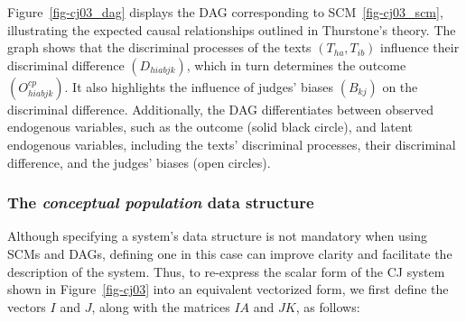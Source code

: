 \documentclass[
  authoryear,
  review,
  1p]{elsarticle}
\begin{document}
Figure~\ref{fig-cj03_dag} displays the DAG corresponding to
SCM~\ref{fig-cj03_scm}, illustrating the expected causal relationships
outlined in Thurstone's theory. The graph shows that the discriminal
processes of the texts \((T_{ha}, T_{ib})\) influence their discriminal
difference \((D_{hiabjk})\), which in turn determines the outcome
\((O^{cp}_{hiabjk})\). It also highlights the influence of judges'
biases \((B_{kj})\) on the discriminal difference. Additionally, the DAG
differentiates between observed endogenous variables, such as the
outcome (solid black circle), and latent endogenous variables, including
the texts' discriminal processes, their discriminal difference, and the
judges' biases (open circles).

\subsubsection{\texorpdfstring{The \emph{conceptual population} data
structure}{The conceptual population data structure}}\label{sec-theory-theoretical_P2}

Although specifying a system's data structure is not mandatory when
using SCMs and DAGs, defining one in this case can improve clarity and
facilitate the description of the system. Thus, to re-express the scalar
form of the CJ system shown in Figure~\ref{fig-cj03} into an equivalent
vectorized form, we first define the vectors \(I\) and \(J\), along with
the matrices \(IA\) and \(JK\), as follows:
\end{document}
